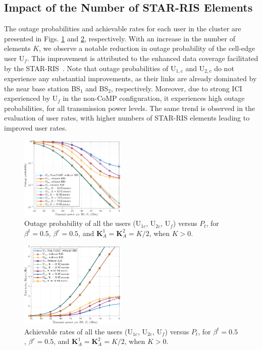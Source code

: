 \documentclass[conference]{IEEEtran}
\begin{document}
\subsection{Impact of the Number of STAR-RIS Elements}
The outage probabilities and achievable rates for each user in the cluster are presented in Figs. \ref{fig:outage} and \ref{fig:rates}, respectively. With an increase in the number of elements $K$, we observe a notable reduction in outage probability of the cell-edge user U$_f$. This improvement is attributed to the enhanced data coverage facilitated by the STAR-RIS~\cite{wang2022outage}. Note that outage probabilities of U$_{1,c}$ and U$_{2,c}$ do not experience any substantial improvements, as their links are already dominated by the near base station BS$_1$ and BS$_2$, respectively. Moreover, due to strong ICI experienced by U$_f$ in the non-CoMP configuration, it experiences high outage probabilities, for all transmission power levels. The same trend is observed in the evaluation of user rates, with higher numbers of STAR-RIS elements leading to improved user rates.
\begin{figure}[t!]
    \centering
    \includegraphics[width=0.45\textwidth]{figs/outage.pdf}
    \caption{Outage probability of all the users ($\text{U}_{1c}$, $\text{U}_{2c}$, $\text{U}_f$) versus $P_{t}$, for $\beta^t=0.5$, $\beta^r=0.5$, and $\textbf{K}_A^1=\textbf{K}_A^2=K/2$, when $K>0$.}
    \label{fig:outage}
\end{figure}
\begin{figure}[t!]
    \centering
    \includegraphics[width=0.45\textwidth]{figs/rates.pdf}
    \caption{Achievable rates of all the users ($\text{U}_{1c}$, $\text{U}_{2c}$, $\text{U}_f$) versus $P_{t}$, for $\beta^t=0.5$, $\beta^r=0.5$, and $\textbf{K}_A^1=\textbf{K}_A^2=K/2$, when $K>0$.}
    \label{fig:rates}
\end{figure}
\end{document}
